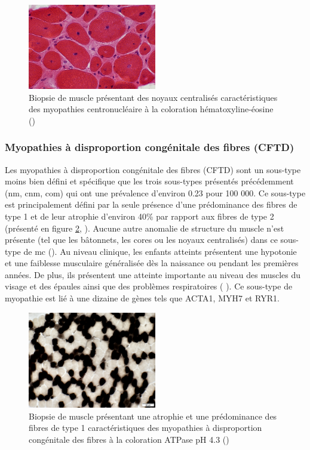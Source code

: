 \begin{figure}[!ht]
 \centering
 \includegraphics[width=0.5\textwidth]{figures/nuc.png}
 \caption[Biopsie de muscle de myopathie centronucléaire.]{Biopsie de muscle présentant des noyaux centralisés caractéristiques des myopathies centronucléaire à la coloration hématoxyline-éosine (\cite{alan_pestronk_neuromuscular_2022})}
 \label{fig:nuc}
\end{figure}

\subsubsection{Myopathies à disproportion congénitale des fibres (CFTD)}
Les myopathies à disproportion congénitale des fibres (CFTD) sont un sous-type moins bien défini et spécifique que les trois sous-types présentés précédemment (\gls{nm}, \gls{cnm}, \gls{com}) qui ont une prévalence d'environ 0.23 pour 100 000. Ce sous-type est principalement défini par la seule présence d'une prédominance des fibres de type 1 et de leur atrophie d'environ 40\% par rapport aux fibres de type 2 (présenté en figure \ref{fig:cftd}, \cite{claeys_congenital_2020} ). Aucune autre anomalie de structure du muscle n'est présente (tel que les bâtonnets, les cores ou les noyaux centralisés) dans ce sous-type de \gls{mc} (\cite{claeys_congenital_2020}). Au niveau clinique, les enfants atteints présentent une hypotonie et une faiblesse musculaire généralisée dès la naissance ou pendant les premières années. De plus, ils présentent une atteinte importante au niveau des muscles du visage et des épaules ainsi que des problèmes respiratoires (\cite{claeys_congenital_2020} ). Ce sous-type de myopathie est lié à une dizaine de gènes tels que ACTA1, MYH7 et RYR1.
\begin{figure}[!ht]
 \centering
 \includegraphics[width=0.5\textwidth]{figures/cftd.jpg}
 \caption[Biopsie de muscle de myopathie à disproportion congénitale des fibres]{Biopsie de muscle présentant une atrophie et une prédominance des fibres de type 1 caractéristiques des myopathies à disproportion congénitale des fibres à la coloration ATPase pH 4.3 (\cite{alan_pestronk_neuromuscular_2022})}
 \label{fig:cftd}
\end{figure}
